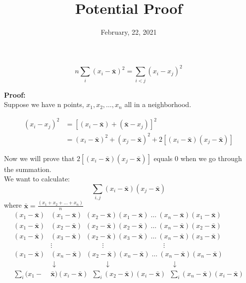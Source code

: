 \documentclass[12pt, fleqn]{article}
\title{Potential Proof\vspace{-2em}}
\date{February, 22, 2021}
\begin{document}
\maketitle

\[ 
n \sum_{i}(x_i - \bm\bar{x})^2 = \sum_{i<j} (x_i - x_j)^2 
\]

\textbf{Proof:\\}
Suppose we have n points, $x_1, x_2, \ldots, x_n$ all in a neighborhood.

\begin{align*}
(x_i - x_j)^2 &= [(x_i - \bm\bar{x}) + (\bm\bar{x} - x_j)]^2 \\
&= (x_i - \bm\bar{x})^2 + (x_j - \bm\bar{x})^2 + 2[(x_i - \bm\bar{x})(x_j - \bm\bar{x})]
\end{align*}

Now we will prove that $2[(x_i - \bm\bar{x})(x_j - \bm\bar{x})]$ equals 0 when we go through the summation. \\
We want to calculate: \[\sum_{i, j}(x_i - \bm\bar{x})(x_j - \bm\bar{x})\] where $\bm\bar{x} = \frac{(x_1 + x_2 + \ldots + x_n)}{n}$
\begin{align*}
(x_1 - \bm\bar{x})&(x_1 - \bm\bar{x})\;     \:(x_2 - \bm\bar{x})(x_1 - \bm\bar{x})\; \ldots \:(x_n - \bm\bar{x})(x_1 - \bm\bar{x}) \\
(x_1 - \bm\bar{x})&(x_2 - \bm\bar{x})\;     \:(x_2 - \bm\bar{x})(x_2 - \bm\bar{x})\; \ldots \:(x_n - \bm\bar{x})(x_2 - \bm\bar{x}) \\
(x_1 - \bm\bar{x})&(x_3 - \bm\bar{x})\;     \:(x_2 - \bm\bar{x})(x_3 - \bm\bar{x})\; \ldots \:(x_n - \bm\bar{x})(x_3 - \bm\bar{x}) \\
&\vdots \;\;\;\;\;\;\;\;\;\;\;\;\;\;\;\;\;\;\;\;\;\;\;\;\;\; \vdots \;\;\;\;\;\;\;\;\;\;\;\;\;\;\;\;\;\;\;\;\;\;\;\;\;\;\;\;\;\;\; \vdots \\
(x_1 - \bm\bar{x})&(x_n - \bm\bar{x})\;     \:(x_2 - \bm\bar{x})(x_n - \bm\bar{x})\; \ldots \:(x_n - \bm\bar{x})(x_n - \bm\bar{x}) \\
&\downarrow \;\;\;\;\;\;\;\;\;\;\;\;\;\;\;\;\;\;\;\;\;\;\;\; \downarrow \;\;\;\;\;\;\;\;\;\;\;\;\;\;\;\;\;\;\;\;\;\;\;\;\;\;\;\;\;\;\; \downarrow \\
\sum_{i}(x_1 -& \bm\bar{x})(x_i - \bm\bar{x})\; \:\sum_{i}(x_2 - \bm\bar{x})(x_i - \bm\bar{x})\; \:\sum_{i}(x_n - \bm\bar{x})(x_i - \bm\bar{x}) 
\end{align*}
\end{document}
